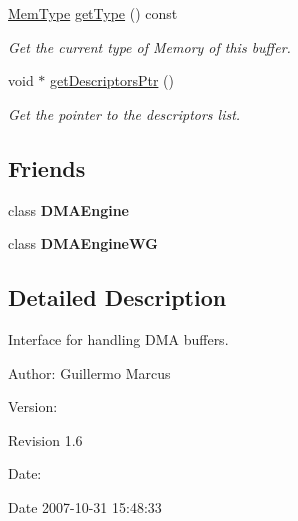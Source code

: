 \begin{CompactItemize}
\hyperlink{classmprace_1_1DMABuffer_w3}{Mem\-Type} \hyperlink{classmprace_1_1DMABuffer_a6}{get\-Type} () const 
\begin{CompactList}\small\item\em Get the current type of Memory of this buffer. \item\end{CompactList}\item 
void $\ast$ \hyperlink{classmprace_1_1DMABuffer_a7}{get\-Descriptors\-Ptr} ()
\begin{CompactList}\small\item\em Get the pointer to the descriptors list. \item\end{CompactList}\end{CompactItemize}
\subsection*{Friends}
\begin{CompactItemize}
\item 
\hypertarget{classmprace_1_1DMABuffer_n0}{
class {\bf DMAEngine}}
\label{classmprace_1_1DMABuffer_n0}

\item 
\hypertarget{classmprace_1_1DMABuffer_n1}{
class {\bf DMAEngine\-WG}}
\label{classmprace_1_1DMABuffer_n1}

\end{CompactItemize}


\subsection{Detailed Description}
Interface for handling DMA buffers. 

\begin{Desc}
\item[Author:]Guillermo Marcus \end{Desc}
\begin{Desc}
\item[Version:]\begin{Desc}
\item[Revision]1.6 \end{Desc}
\end{Desc}
\begin{Desc}
\item[Date:]\begin{Desc}
\item[Date]2007-10-31 15:48:33 \end{Desc}
\end{Desc}




